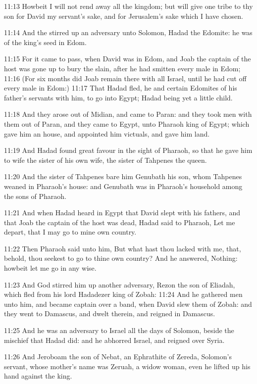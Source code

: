 11:13 Howbeit I will not rend away all the kingdom; but will give one tribe to thy son for David my servant's sake, and for Jerusalem's sake which I have chosen.

11:14 And the \LORD stirred up an adversary unto Solomon, Hadad the Edomite: he was of the king's seed in Edom.

11:15 For it came to pass, when David was in Edom, and Joab the captain of the host was gone up to bury the slain, after he had smitten every male in Edom; 11:16 (For six months did Joab remain there with all Israel, until he had cut off every male in Edom:) 11:17 That Hadad fled, he and certain Edomites of his father's servants with him, to go into Egypt; Hadad being yet a little child.

11:18 And they arose out of Midian, and came to Paran: and they took men with them out of Paran, and they came to Egypt, unto Pharaoh king of Egypt; which gave him an house, and appointed him victuals, and gave him land.

11:19 And Hadad found great favour in the sight of Pharaoh, so that he gave him to wife the sister of his own wife, the sister of Tahpenes the queen.

11:20 And the sister of Tahpenes bare him Genubath his son, whom Tahpenes weaned in Pharaoh's house: and Genubath was in Pharaoh's household among the sons of Pharaoh.

11:21 And when Hadad heard in Egypt that David slept with his fathers, and that Joab the captain of the host was dead, Hadad said to Pharaoh, Let me depart, that I may go to mine own country.

11:22 Then Pharaoh said unto him, But what hast thou lacked with me, that, behold, thou seekest to go to thine own country? And he answered, Nothing: howbeit let me go in any wise.

11:23 And God stirred him up another adversary, Rezon the son of Eliadah, which fled from his lord Hadadezer king of Zobah: 11:24 And he gathered men unto him, and became captain over a band, when David slew them of Zobah: and they went to Damascus, and dwelt therein, and reigned in Damascus.

11:25 And he was an adversary to Israel all the days of Solomon, beside the mischief that Hadad did: and he abhorred Israel, and reigned over Syria.

11:26 And Jeroboam the son of Nebat, an Ephrathite of Zereda, Solomon's servant, whose mother's name was Zeruah, a widow woman, even he lifted up his hand against the king.


